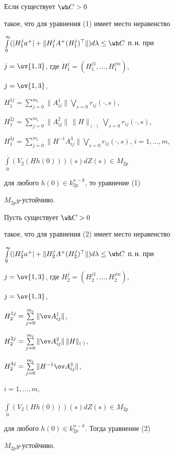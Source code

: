 \begin{cor}


Если существует $\wh C > 0$ 


такое, что для уравнения (1) имеет место неравенство 


$\int \limits_0^\infty (|H_1^ja^+| + 


\|H_1^jA^+(H_1^j)^\top \|)d\lambda \le \wh C$ п.\,н. при 


$j = \ov{1,3}$, где $H_1^j = (H_1^{j1},\dotsc, H_1^{jm})$, 


$j = \ov{1,3}$, 


$H_1^{1j} = \sum \limits_{j=0}^{m_i}\|A_{ij}^1\|


\bigvee \limits_{s=0}^{\displaystyle .}r_{ij}(\cdot,s)$, 


$H_1^{2j} = \sum \limits_{j=0}^{m_i}\|A_{ij}^2\|\,\|H\|_{(\cdot)}


\bigvee \limits_{s=0}^{\displaystyle .}r_{ij}(\cdot,s)$, 


$H_1^{3j} = \sum \limits_{j=0}^{m_i}\|H^{-1}A_{ij}^3\|


\bigvee \limits_{s=0}^{\displaystyle .}r_{ij}(\cdot,s)$, $i = 1,\dotsc, m$, 


$\int \limits_0^{\displaystyle .}(V_2(Hh(0)))(s)dZ(s) \in M_{2p}$ 


для любого $h(0) \in k_{2p}^{n-k}$, то уравнение (1) 


$M_{2p}y$-устойчиво.


\end{cor}





\begin{cor}


Пусть существует $\wh C > 0$ 


такое, что для уравнения (2) имеет место неравенство 


$\int \limits_0^\infty (|H_2^ja^+| + 


\|H_2^jA^+(H_2^j)^\top \|)d\lambda \le \wh C$ п.\,н. при 


$j = \ov{1,3}$, где $H_2^j = (H_2^{j1},\dotsc, H_2^{jm})$, 


$j = \ov{1,3}$, 


$H_2^{1j} = \sum \limits_{j=0}^{m_i}\|\ov A_{ij}^1\|$, 


$H_2^{2j} = \sum \limits_{j=0}^{m_i}\|\ov A_{ij}^2\|\,\|H\|_{(\cdot)}$, 


$H_2^{3j} = \sum \limits_{j=0}^{m_i}\|H^{-1}\ov A_{ij}^3\|$, 


$i = 1,\dotsc, m$, 


$\int \limits_0^{\displaystyle .}(V_2(Hh(0)))(s)dZ(s) \in M_{2p}$ 


для любого $h(0) \in k_{2p}^{n-k}$. Тогда уравнение (2) 


$M_{2p}y$-устойчиво.


\end{cor}






